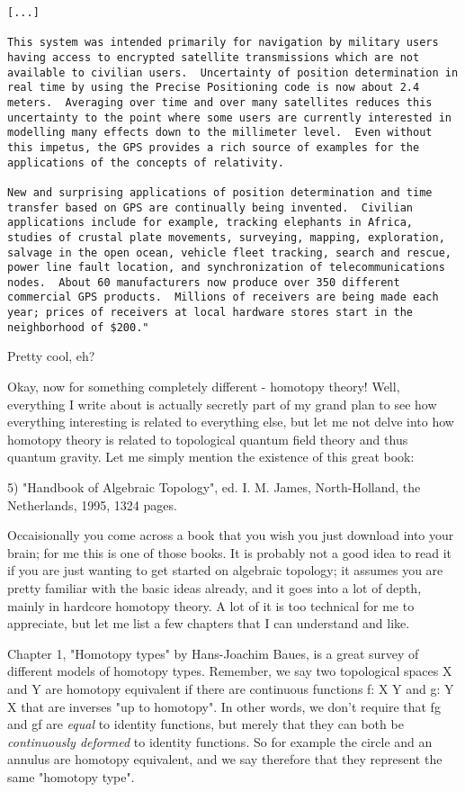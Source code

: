 \begin{verbatim}
[...]

This system was intended primarily for navigation by military users
having access to encrypted satellite transmissions which are not
available to civilian users.  Uncertainty of position determination in
real time by using the Precise Positioning code is now about 2.4
meters.  Averaging over time and over many satellites reduces this
uncertainty to the point where some users are currently interested in
modelling many effects down to the millimeter level.  Even without
this impetus, the GPS provides a rich source of examples for the
applications of the concepts of relativity.

New and surprising applications of position determination and time
transfer based on GPS are continually being invented.  Civilian
applications include for example, tracking elephants in Africa,
studies of crustal plate movements, surveying, mapping, exploration,
salvage in the open ocean, vehicle fleet tracking, search and rescue,
power line fault location, and synchronization of telecommunications
nodes.  About 60 manufacturers now produce over 350 different
commercial GPS products.  Millions of receivers are being made each
year; prices of receivers at local hardware stores start in the
neighborhood of $200."

\end{verbatim}
    

Pretty cool, eh?  

Okay, now for something completely different - homotopy theory!  Well,
everything I write about is actually secretly part of my grand plan to
see how everything interesting is related to everything else, but let
me not delve into how homotopy theory is related to topological
quantum field theory and thus quantum gravity.  Let me simply mention
the existence of this great book:

5) "Handbook of Algebraic Topology", ed. I. M. James, North-Holland,
the Netherlands, 1995, 1324 pages.

Occaisionally you come across a book that you wish you just download
into your brain; for me this is one of those books.  It is probably
not a good idea to read it if you are just wanting to get started
on algebraic topology; it assumes you are pretty familiar with the
basic ideas already, and it goes into a lot of depth, mainly in hardcore
homotopy theory.  A lot of it is too technical for me to appreciate,
but let me list a few chapters that I can understand and like.

Chapter 1, "Homotopy types" by Hans-Joachim Baues, is a great survey
of different models of homotopy types.  Remember, we say two
topological spaces X and Y are homotopy equivalent if there are
continuous functions f: X \to  Y and g: Y \to  X that are inverses "up to
homotopy".  In other words, we don't require that fg and gf are
\emph{equal} to identity functions, but merely that they can both be
\emph{continuously deformed} to identity functions.  So for example the
circle and an annulus are homotopy equivalent, and we say therefore
that they represent the same "homotopy type".

